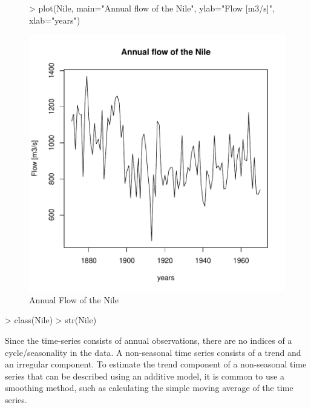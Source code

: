 \documentclass[10pt, a4paper]{article} %
\begin{document}
\begin{figure}[h!]
\centering
\begin{Schunk}
\begin{Sinput}
> plot(Nile, main="Annual flow of the Nile", ylab="Flow [m3/s]", xlab="years")
\end{Sinput}
\end{Schunk}
\includegraphics{FINAL_VERSION-081}
\caption{Annual Flow of the Nile}
\end{figure}
\begin{Schunk}
\begin{Sinput}
> class(Nile)
> str(Nile)
\end{Sinput}
\end{Schunk}

\noindent Since the time-series consists of annual observations, there are no indices of a cycle/seasonality in the data. A non-seasonal time series consists of a trend and an irregular component. 
To estimate the trend component of a non-seasonal time series that can be described using an additive model, it is common to use a smoothing method, such as calculating the simple moving average of the time series.
\end{document}
